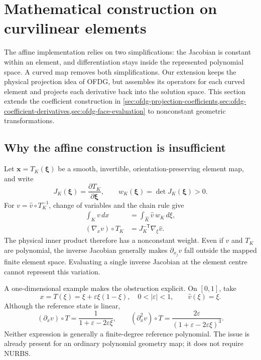 \section{Mathematical construction on curvilinear elements}
\label{sec:curvilinear-mathematics}
The affine implementation relies on two simplifications: the Jacobian is
constant within an element, and differentiation stays inside the represented
polynomial space. A curved map removes both simplifications. Our extension
keeps the physical projection idea of OFDG, but assembles its operators for
each curved element and projects each derivative back into the solution space.
This section extends the coefficient construction in
\cref{sec:ofdg-projection-coefficients,sec:ofdg-coefficient-derivatives,sec:ofdg-face-evaluation}
to nonconstant geometric transformations.

\subsection{Why the affine construction is insufficient}
Let $\boldsymbol x=T_K(\boldsymbol\xi)$ be a smooth, invertible,
orientation-preserving element map, and write
\begin{equation}
 J_K(\boldsymbol\xi)=\frac{\partial T_K}{\partial\boldsymbol\xi},
 \qquad w_K(\boldsymbol\xi)=\det J_K(\boldsymbol\xi)>0.
 \label{eq:curved-jacobian}
\end{equation}
For $v=\widehat v\circ T_K^{-1}$, change of variables and the chain rule give
\begin{align}
 \int_K v\,dx&=\int_{\widehat K}\widehat v\,w_K\,d\xi,
 \label{eq:curved-change-variables}\\
 (\nabla_xv)\circ T_K&=J_K^{-\mathsf T}\nabla_\xi\widehat v.
 \label{eq:curved-chain-rule}
\end{align}
The physical inner product therefore has a nonconstant weight. Even if
$\widehat v$ and $T_K$ are polynomial, the inverse Jacobian generally makes
$\partial_{x_j}v$ fall outside the mapped finite element space. Evaluating a
single inverse Jacobian at the element centre cannot represent this variation.

A one-dimensional example makes the obstruction explicit. On $[0,1]$, take
\begin{equation}
 x=T(\xi)=\xi+\varepsilon\xi(1-\xi),\quad
 0<|\varepsilon|<1,\qquad \widehat v(\xi)=\xi.
\end{equation}
Although the reference state is linear,
\begin{equation}
 (\partial_xv)\circ T=\frac{1}{1+\varepsilon-2\varepsilon\xi},\qquad
 (\partial_x^2v)\circ T=
 \frac{2\varepsilon}{(1+\varepsilon-2\varepsilon\xi)^3}.
 \label{eq:curved-derivative-example}
\end{equation}
Neither expression is generally a finite-degree reference polynomial. The
issue is already present for an ordinary polynomial geometry map; it does not
require NURBS.

